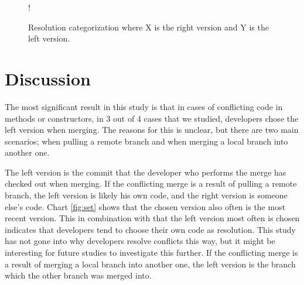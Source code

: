 \begin{figure}
\resizebox {\columnwidth} {!} {
}
\caption{Resolution categorization where X is the right version and Y is the left version.}\label{fig:setright}
\end{figure}

\section{Discussion}
The most significant result in this study is that in cases of conflicting code in methods or constructors, in 3 out of 4 cases that we studied, developers chose the left version when merging. The reasons for this is unclear, but there are two main scenarios; when pulling a remote branch and when merging a local branch into another one.

The left version is the commit that the developer who performs the merge has checked out when merging. If the conflicting merge is a result of pulling a remote branch, the left version is likely his own code, and the right version is someone else’s code. Chart \ref{fig:set} shows that the chosen version also often is the most recent version. This in combination with that the left version most often is chosen indicates that developers tend to choose their own code as resolution. This study has not gone into why developers resolve conflicts this way, but it might be interesting for future studies to investigate this further. If the conflicting merge is a result of merging a local branch into another one, the left version is the branch which the other branch was merged into.

